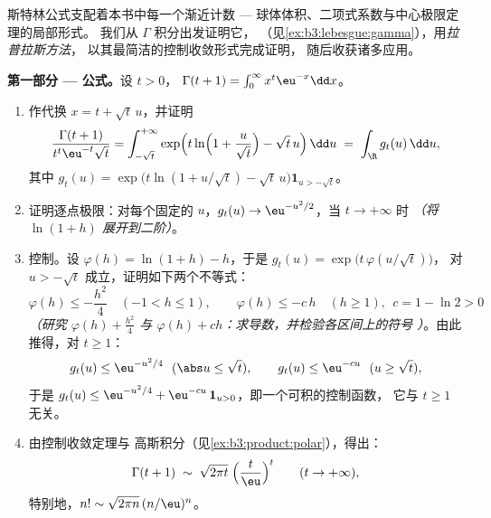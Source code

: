 \begin{problem}
\label{pb:b3:product:1}
斯特林公式支配着本书中每一个渐近计数
--- 球体体积、二项式系数与中心极限定理的局部形式。
我们从 $\Gamma$ 积分出发证明它，
（见\cref{ex:b3:lebesgue:gamma}），用\emph{拉普拉斯方法}，
以其最简洁的控制收敛形式完成证明，
随后收获诸多应用。

\medskip
\noindent\textbf{第一部分 --- 公式。}设 $t > 0$，
$\Gamma(t + 1) = \int_0^\infty x^{t}\eu^{-x}\dd x$。
\begin{enumerate}
  \item 作代换 $x = t + \sqrt t\,u$，并证明
        \[
        \frac{\Gamma(t+1)}{t^{t}\eu^{-t}\sqrt t}
        = \int_{-\sqrt t}^{+\infty}
        \exp\Bigl(t\ln\Bigl(1 + \frac u{\sqrt
        t}\Bigr) - \sqrt t\,u\Bigr)\,\dd u
        \;=\;\int_\R g_t(u)\,\dd u,
        \]
        其中 $g_t(u) = \exp\bigl(t\ln(1 + u/\sqrt t) -
        \sqrt t\,u\bigr)\mathbf 1_{u > -\sqrt t}$。
  \item 证明逐点极限：对每个固定的 $u$，$g_t(u)
        \to \eu^{-u^2/2}$，当 $t \to +\infty$ 时 \emph{（将
        $\ln(1 + h)$ 展开到二阶）}。
  \item 控制。设 $\varphi(h) = \ln(1 + h) - h$，于是
        $g_t(u) = \exp\bigl(t\,\varphi(u/\sqrt t)\bigr)$，
        对 $u > -\sqrt t$ 成立，证明如下两个不等式：
        \[
        \varphi(h) \leq -\frac{h^2}4 \quad (-1 < h \leq 1),
        \qquad
        \varphi(h) \leq -c\,h \quad (h \geq 1),\ \ c = 1 -
        \ln 2 > 0
        \]
        \emph{（研究 $\varphi(h) + \frac{h^2}4$ 与 $\varphi(h)
        + ch$：求导数，并检验各区间上的符号
        ）}。由此推得，对 $t \geq 1$：
        \[
        g_t(u) \leq \eu^{-u^2/4}\ \ (\abs u \leq \sqrt t),
        \qquad
        g_t(u) \leq \eu^{-cu}\ \ (u \geq \sqrt t),
        \]
        于是 $g_t(u) \leq \eu^{-u^2/4} +
        \eu^{-cu}\,\mathbf 1_{u > 0}$，即一个可积的控制函数，
        它与 $t \geq 1$ 无关。
  \item 由控制收敛定理与
        高斯积分（见\cref{ex:b3:product:polar}），得出：
        \[
        \Gamma(t + 1) \;\sim\;
        \sqrt{2\pi t}\;\Bigl(\frac t\eu\Bigr)^{t}
        \qquad (t \to +\infty),
        \]
        特别地，$n! \sim \sqrt{2\pi
        n}\,(n/\eu)^n$。
\end{enumerate}


\end{problem}
